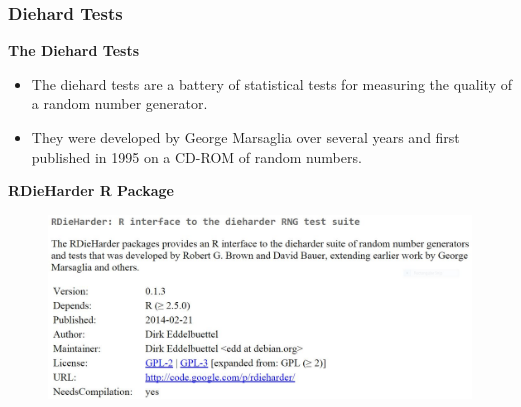 \documentclass[MAIN.tex]{subfiles}
\begin{document}
 
%		
\begin{frame}[fragile]
\frametitle{Diehard Tests}
\large
\textbf{The Diehard Tests}
\begin{itemize}
\item The diehard tests are a battery of statistical tests for measuring the quality of a random number generator. 
\item They were developed by George Marsaglia over several years and first published in 1995 on a CD-ROM of random numbers.
\end{itemize}


\end{frame}
\begin{frame}
\textbf{RDieHarder R Package}
	\begin{figure}
		\centering
		\includegraphics[width=1.05\linewidth]{images/Rdieharder}
		
	\end{figure}
	
\end{frame}
\end{document}
